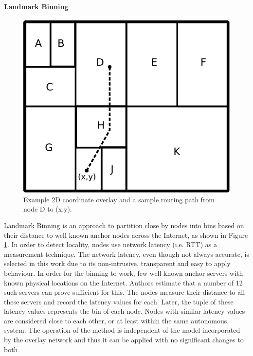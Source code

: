 \paragraph*{\bf Landmark Binning}\label{sec:landmark_binning}
\begin{figure}
\centering
  \includegraphics[scale=0.4]{img/algorithms/landmark_binning}
\caption{Example 2D coordinate overlay and a sample routing path from node D to
(x,y).}
\label{fig:landmark_binning}
\end{figure}
Landmark Binning \cite{ratnasamy_binning_2002} is an approach to partition close
by nodes into bins based on their distance to well known anchor nodes across the
Internet, as shown in Figure \ref{fig:landmark_binning}. In order to detect
locality, nodes use network latency (i.e. RTT) as a measurement technique. The
network latency, even though not always accurate, is selected in this work due
to its non-intrusive, transparent and easy to apply behaviour. In order for the
binning to work, few well known anchor servers with known physical locations on
the Internet. Authors estimate that a number of 12 such servers can prove
sufficient for this. The nodes measure their distance to all these servers and
record the latency values for each. Later, the tuple of these latency values
represents the bin of each node. Nodes with similar latency values are
considered close to each other, or at least within the same autonomous system.
The operation of the method is independent of the model incorporated by the
overlay network and thus it can be applied with no significant changes to both
